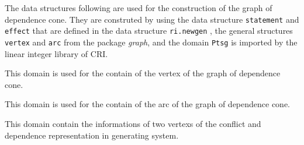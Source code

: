 \documentclass[a4paper]{article}
\begin{document}
\sloppy
The data structures following are used for the construction of the graph
of dependence cone. They are construted by using the data structure
\verb+statement+ and \verb+effect+ that are defined in the data structure
\verb+ri.newgen+ , the general structures \verb+vertex+ and \verb+arc+
from the package {\em graph}, and the domain {\tt Ptsg} is imported by the
linear integer library of CRI.   

{}
{}
{}      

{This domain is used for the contain of the vertex of the graph of
dependence cone.}

{This domain is used for the contain of the arc of the graph of
dependence cone.}

{This domain contain the informations of two vertexs of the conflict and
dependence representation in generating system.} 
\end{document}
